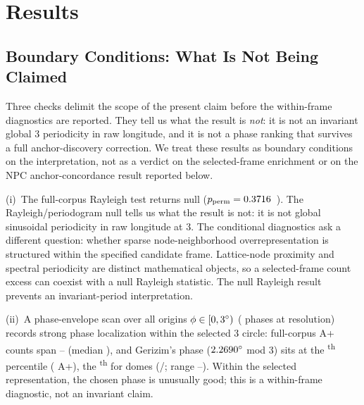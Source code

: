 \section{Results}

\label{sec:results}

\subsection{Boundary Conditions: What Is Not Being Claimed}
\label{sec:results_phase_invariant}
\label{sec:results_boundary}

Three checks delimit the scope of the present claim before the
within-frame diagnostics are reported. They tell us what the result is
\textit{not}: it is not an invariant global 3\textdegree{} periodicity
in raw longitude, and it is not a phase ranking that survives a full
anchor-discovery correction. We treat these results as boundary
conditions on the interpretation, not as a verdict on the
selected-frame enrichment or on the NPC anchor-concordance result
reported below.

(i)~The full-corpus Rayleigh test returns null
($p_\mathrm{perm} = 0.3716$~\fullRayleighPermPSig{}). The
Rayleigh/periodogram null tells us what the result is not: it is not
global sinusoidal periodicity in raw longitude at 3\textdegree{}.
The conditional diagnostics ask a different question: whether sparse
node-neighborhood overrepresentation is structured within the
specified candidate frame. Lattice-node proximity and spectral
periodicity are distinct mathematical objects, so a selected-frame
count excess can coexist with a null Rayleigh statistic. The null
Rayleigh result prevents an invariant-period interpretation.

(ii)~A phase-envelope scan over all origins
$\phi \in [0,3\textdegree{})$ (\phaseNphases{} phases at \phaseStep\textdegree{}
resolution) records strong phase localization within the selected
3\textdegree{} circle: full-corpus A+ counts span
\phaseFullMin{}--\phaseFullMax{} (median \phaseFullMedian{}), and
Gerizim's phase ($\phaseGerizimPhase\textdegree{}$ mod 3\textdegree{})
sits at the \phaseFullGerPctile\textsuperscript{th} percentile
(\phaseFullGerCount{} A+), the
\phaseDomeGerPctile\textsuperscript{th} for domes
(\phaseDomeGerCount/\NcircTotal{}; range
\phaseDomeMin{}--\phaseDomeMax{}). Within the selected representation,
the chosen phase is unusually good; this is a within-frame
diagnostic, not an invariant claim.

